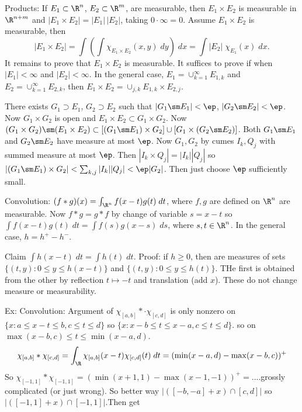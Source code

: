 Products:
If $E_1 \subset \R^n$, $E_2 \subset \R^m$, are measurable, then $E_1 \times E_2$ is measurable in $\R^{n+m}$ and $|E_1 \times E_2|= |E_1| \, |E_2|$, taking $0 \cdot \infty= 0$. Assume $E_1 \times E_2$ is measurable, then
	\[
	|E_1 \times E_2|= \int (\int \chi_{E_1 \times E_2}(x,y) \; dy) \; dx= \int |E_2| \; \chi_{E_1}(x) \; dx.
	\]
It remains to prove that $E_1 \times E_2$ is measurable. It suffices to prove if when $|E_1|<\infty$ and $|E_2|<\infty$. In the general case, $E_1= \cup_{k=1}^\infty E_{1,k}$ and $E_2= \cup_{k=1}^\infty E_{2,k}$, then $E_1 \times E_2= \cup_{j,k} E_{1,k} \times E_{2,j}$. 

There exists $G_1 \supset E_1$, $G_2 \supset E_2$ such that $|G_1 \sm E_1|<\ep$, $|G_2 \sm E_2|<\ep$. Now $G_1 \times G_2$ is open and $E_1 \times E_2 \subset G_1 \times G_2$. Now $(G_1 \times G_2) \sm (E_1 \times E_2) \subset [(G_1 \sm E_1) \times G_2] \cup [G_1 \times (G_2 \sm E_2)]$. Both $G_1 \sm E_1$ and $G_2 \sm E_2$ have measure at most $\ep$. Now $G_1, G_2$ by cumes $I_k, Q_j$ with summed measure at most $\ep$. Then $|I_k \times Q_j|= |I_k||Q_j|$ so $|(G_1 \sm E_1) \times G_2| < \sum_{k,j} |I_k| |Q_j| < \ep |G_2|$. Then just choose $\ep$ sufficiently small. 




Convolution: $(f*g)(x)= \int_{\R^n} f(x-t)g(t) \;dt$, where $f,g$ are defined on $\R^n$ are measurable.  Now $f*g=g*f$ by change of variable $s=x-t$ so $\int f(x-t)g(t) \; dt = \int f(s) g(x-s) \; ds$, where $s,t \in \R^n$. In the general case, $h= h^+ - h^-$. 

Claim $\int h(x-t) \; dt = \int h(t) \; dt$. Proof: if $h \geq 0$, then are measures of sets $\{(t,y) \colon 0 \leq y \leq h(x-t)\}$ and $\{ (t,y) \colon 0 \leq y \leq h(t) \}$. THe first is obtained from the other by reflection $t \mapsto -t$ and translation (add $x$). These do not change measure or measurability. 


\begin{ex}
Ex: Convolution: Argument of $\chi_{[a,b]} *\cdot \chi_{[c,d]}$ is only nonzero on $\{x \colon a \leq x-t \leq b, c \leq t \leq d\}$ so $\{x \colon x-b \leq t \leq x-a, c \leq t \leq d\}$. so on $\max(x-b,c) \leq t \leq \min(x-a,d)$. 
	\[
	\chi_{[a,b]} * \chi_{[c,d]}= \int_\R \chi_{[a,b]}(x-t) \chi_{[c,d]}(t) \; dt =  (\min(x-a,d) - \max(x-b,c))^+
	\]
So $\chi_{[-1,1]} * \chi_{[-1,1]}= (\min(x+1,1) - \max(x-1,-1))^+=$....grossly complicated (or just wrong). So better way $|([-b,-a] + x) \cap [c,d]|$ so $|([-1,1]+x) \cap [-1,1]|$.Then get 
\end{ex}


